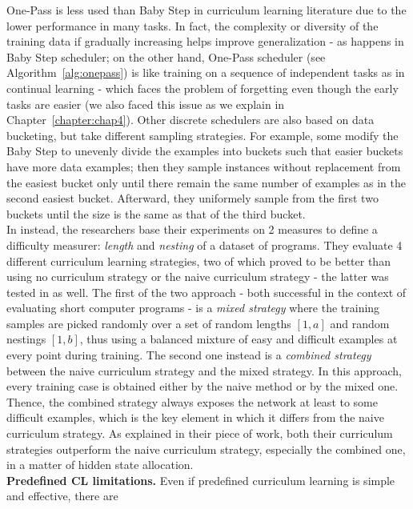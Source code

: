 One-Pass is less used than Baby Step in curriculum learning literature due to the lower performance in many tasks.
In fact, the complexity or diversity of the training data if gradually increasing
helps improve generalization - as happens in Baby Step scheduler; on the other hand,
One-Pass scheduler (see Algorithm~\ref{alg:onepass}) is like training on a sequence of independent tasks as in 
continual learning - which faces the problem of forgetting even though the early tasks are easier 
(we also faced this issue as we explain in Chapter~\ref{chapter:chap4}).
Other discrete schedulers are also based on data bucketing, but take 
different sampling strategies. For example, some \cite{kocmi2017curriculum} modify the Baby Step to unevenly divide 
the examples into buckets such that easier buckets have more data examples; then they sample instances
without replacement from the easiest bucket only until there remain the same number of 
examples as in the second easiest bucket. Afterward, they uniformely sample 
from the first two buckets until the size is the same as that of the third bucket.\\
In \cite{zaremba2014learning} instead, the researchers base their experiments on 2 measures to 
define a difficulty measurer: \textit{length} and \textit{nesting} of a dataset of programs.
They evaluate 4 different curriculum learning strategies, two of which proved to be better than using no curriculum strategy or the 
naive curriculum strategy - the latter was tested in \cite{bengio2009curriculum} as well.
The first of the two approach - both successful in the context of evaluating 
short computer programs - is a \textit{mixed strategy} where the training samples
are picked randomly over a set of random lengths \([1, a]\) and random nestings \([1, b]\),
thus using a balanced mixture of easy and difficult examples at every point during training.
The second one instead is a \textit{combined strategy} between the naive curriculum strategy 
and the mixed strategy. In this approach, every training case is obtained 
either by the naive method or by the mixed one. 
Thence, the combined strategy always exposes the network at least to some difficult examples, which is the key element 
in which it differs from the naive curriculum strategy. As explained in their 
piece of work, both their curriculum strategies outperform the naive curriculum strategy, especially 
the combined one, in a matter of hidden state allocation.\\
\textbf{Predefined CL limitations.} Even if predefined curriculum learning is simple and effective, there are 
